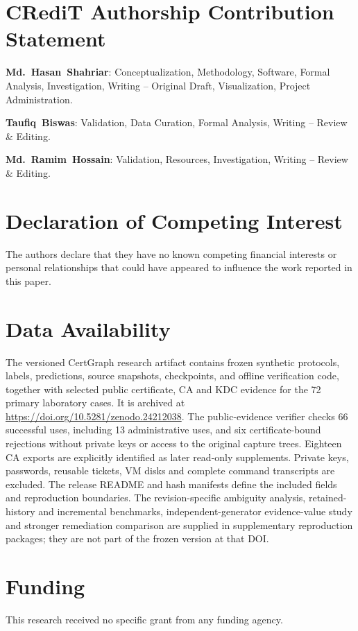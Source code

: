 \section*{CRediT Authorship Contribution Statement}
\noindent\textbf{Md.~Hasan~Shahriar}: Conceptualization, Methodology, Software, Formal Analysis, Investigation, Writing -- Original Draft, Visualization, Project Administration.
\par\smallskip\noindent\textbf{Taufiq~Biswas}: Validation, Data Curation, Formal Analysis, Writing -- Review \& Editing.
\par\smallskip\noindent\textbf{Md.~Ramim~Hossain}: Validation, Resources, Investigation, Writing -- Review \& Editing.

\section*{Declaration of Competing Interest}
\noindent The authors declare that they have no known competing financial interests or personal relationships that could have appeared to influence the work reported in this paper.

\section*{Data Availability}
\noindent The versioned CertGraph research artifact contains frozen synthetic protocols, labels, predictions, source snapshots, checkpoints, and offline verification code, together with selected public certificate, CA and KDC evidence for the 72 primary laboratory cases. It is archived at \url{https://doi.org/10.5281/zenodo.24212038}. The public-evidence verifier checks 66 successful uses, including 13 administrative uses, and six certificate-bound rejections without private keys or access to the original capture trees. Eighteen CA exports are explicitly identified as later read-only supplements. Private keys, passwords, reusable tickets, VM disks and complete command transcripts are excluded. The release README and hash manifests define the included fields and reproduction boundaries. The revision-specific ambiguity analysis, retained-history and incremental benchmarks, independent-generator evidence-value study and stronger remediation comparison are supplied in supplementary reproduction packages; they are not part of the frozen version at that DOI.

\section*{Funding}
\noindent This research received no specific grant from any funding agency.

